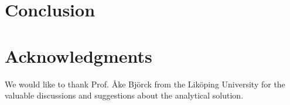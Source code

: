 \documentclass[conference]{IEEEtran}
\begin{document}
  \section{Conclusion} \label{sec:conclusion}
  

  \section{Acknowledgments}
  We would like to thank Prof. {\AA}ke Bj\"{o}rck from the Lik\"{o}ping University for the valuable discussions and suggestions about the analytical solution.

  
\end{document}
